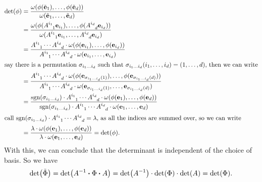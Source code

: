 \begin{align*}
    \det(\phi) & = \frac{\omega(\phi(\tilde{\vb{e}}_1), \ldots, \phi(\tilde{\vb{e}}_d))}{\omega(\tilde{\vb{e}}_1, \ldots, \tilde{\vb{e}}_d)}                                                                                                                                                                                           \\
               & = \frac{\omega(\phi(\tensor{A}{^{i_1}_1} \vb{e}_{i_1}), \ldots, \phi(\tensor{A}{^{i_d}_d} \vb{e}_{i_d}))}{\omega(\tensor{A}{^{i_1}_1} \vb{e}_{i_1}, \ldots, \tensor{A}{^{i_d}_d} \vb{e}_{i_d})}                                                                                                                       \\
               & = \frac{\tensor{A}{^{i_1}_1} \cdots \tensor{A}{^{i_d}_d} \cdot \omega(\phi(\vb{e}_{i_1}), \ldots, \phi(\vb{e}_{i_d}))}{\tensor{A}{^{i_1}_1} \cdots \tensor{A}{^{i_d}_d} \cdot \omega(\vb{e}_{i_1}, \ldots, \vb{e}_{i_d})}                                                                                             \\
    \intertext{say there is a permutation \(\sigma_{i_1 \ldots i_d}\) such that \(\sigma_{i_1 \ldots i_d}(i_1, \ldots, i_d) = (1, \ldots, d)\), then we can write}
               & = \frac{\tensor{A}{^{i_1}_1} \cdots \tensor{A}{^{i_d}_d} \cdot \omega(\phi(\vb{e}_{\sigma_{i_1 \ldots i_d}(1)}), \ldots, \phi(\vb{e}_{\sigma_{i_1 \ldots i_d}(d)}))}{\tensor{A}{^{i_1}_1} \cdots \tensor{A}{^{i_d}_d} \cdot \omega(\vb{e}_{\sigma_{i_1 \ldots i_d}(1)}, \ldots, \vb{e}_{\sigma_{i_1 \ldots i_d}(d)})} \\
               & = \frac{\sgn(\sigma_{i_1 \ldots i_d}) \cdot \tensor{A}{^{i_1}_1} \cdots \tensor{A}{^{i_d}_d} \cdot \omega(\phi(\vb{e}_1), \ldots, \phi(\vb{e}_d))}{\sgn(\sigma_{i_1 \ldots i_d}) \cdot \tensor{A}{^{i_1}_1} \cdots \tensor{A}{^{i_d}_d} \cdot \omega(\vb{e}_1, \ldots, \vb{e}_d)}                                     \\
    \intertext{call \(\sgn(\sigma_{i_1 \ldots i_d}) \cdot \tensor{A}{^{i_1}_1} \cdots \tensor{A}{^{i_d}_d} = \lambda\), as all the indices are summed over, so we can write}
               & = \frac{\lambda \cdot \omega(\phi(\vb{e}_1), \ldots, \phi(\vb{e}_d))}{\lambda \cdot \omega(\vb{e}_1, \ldots, \vb{e}_d)} = \det(\phi).
\end{align*}
With this, we can conclude that the determinant is independent of the choice of basis. So we have
\begin{equation}
    \det(\tilde{\Phi}) = \det(A\inv \vdot \Phi \vdot A) = \det(A\inv) \cdot \det(\Phi) \cdot \det(A) = \det(\Phi).
\end{equation}
